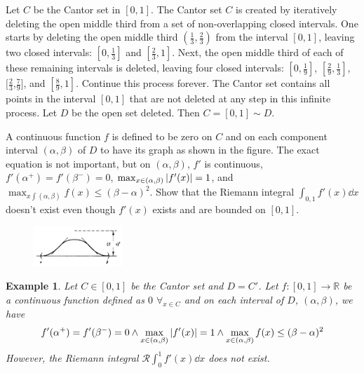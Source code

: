 \documentclass[]{article}
\newcommand{\R}{\mathbb{R}}
\newtheorem{example}{Example}
\begin{document}
\newpage
\section{}
Let $C$ be the Cantor set in $[0, 1]$. 
The Cantor set $C$ is created by iteratively deleting the open middle third from a set of non-overlapping closed intervals. 
One starts by deleting the open middle third $(\frac{1}{3}, \frac{2}{3})$ from the interval $[0,1]$, leaving two closed intervals: $[0, \frac{1}{3}]$ and $[\frac{2}{3},1]$. 
Next, the open middle third of each of these remaining intervals is deleted, leaving four closed intervals: $[0,\frac{1}{9}]$, $[\frac{2}{9},\frac{1}{3}]$, $[\frac{2}{3}$,$\frac{7}{9}]$, and $[\frac{8}{9},1]$.
Continue this process forever.
The Cantor set contains all points in the interval $[0, 1]$ that are not deleted at any step in this infinite process. 
Let $D$ be the open set deleted. 
Then $C = [0,1] \sim D$.

A continuous function $f$ is defined to be zero on $C$ and on each component interval $(\alpha, \beta)$ of $D$ to have its graph as shown in the figure. 
The exact equation is not important, but on $(\alpha,\beta)$, $f'$ is continuous, $f'(\alpha^+) = f'(\beta^-) = 0$, $\max_{x\in(\alpha,\beta)} \abs{f'(x)} = 1$, and $\max_{x\int(\alpha,\beta)} f(x) \leq (\beta-\alpha)^2$. 
Show that the Riemann integral $\int_{0,1} f'(x) \dd{x}$ doesn't exist even though $f'(x)$ exists and are bounded on $[0,1]$.

\begin{figure}[h]
    \centering
    \includegraphics*[width=0.3\textwidth]{figs/pblm5.png}
\end{figure}


\begin{example}
    Let $C \in [0,1]$ be the Cantor set and $D = C'$.
    Let $f : [0,1] \to \R$ be a continuous function defined as $0$ $\forall_{x\in C}$ and on each interval of $D$, $(\alpha,\beta)$, we have \[
        f'(\alpha^+) = f'(\beta^-) = 0 \land \max_{x\in(\alpha,\beta)} \abs{f'(x)}=1 \land \max_{x\in(\alpha,\beta)} f(x) \leq (\beta - \alpha)^2
    \] However, the Riemann integral $\mathcal{R} \int_{0}^{1} f'(x) \dd{x}$ does not exist.
\end{example}
\end{document}

